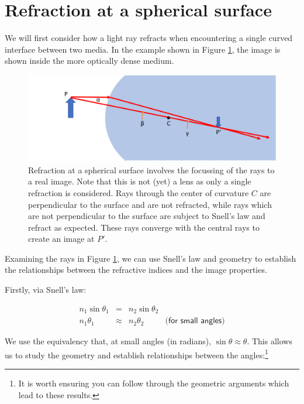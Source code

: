 \documentclass[
]{book}
\begin{document}
\hypertarget{sec:ch16-sphericalsurface1}{%
\section{Refraction at a spherical surface}\label{sec:ch16-sphericalsurface1}}

We will first consider how a light ray refracts when encountering a single curved interface between two media. In the example shown in Figure \ref{fig:ch16-sphericalsurface1}, the image is shown inside the more optically dense medium.

\begin{figure}

{\centering \includegraphics[width=0.7\linewidth]{visualisations/LaTeX/ch16-sphericalsurface} 

}

\caption{Refraction at a spherical surface involves the focussing of the rays to a real image. Note that this is not (yet) a lens as only a single refraction is considered. Rays through the center of curvature $C$ are perpendicular to the surface and are not refracted, while rays which are not perpendicular to the surface are subject to Snell's law and refract as expected. These rays converge with the central rays to create an image at $P'$.}\label{fig:ch16-sphericalsurface1}
\end{figure}

Examining the rays in Figure \ref{fig:ch16-sphericalsurface1}, we can use Snell's law and geometry to establish the relationships between the refractive indices and the image properties.

Firstly, via Snell's law:

\begin{equation}
\begin{array}{rcll}
n_1 \sin \theta_1 &=& n_2 \sin \theta_2 &\\
n_1 \theta_1 &\approx& n_2 \theta_2 & \textsf{(for small angles)}
\end{array}
\label{eq:ch16-lensequation1}
\end{equation}

We use the equivalency that, at small angles (in radians), \(\sin \theta \approx \theta\). This allows us to study the geometry and establish relationships between the angles:\footnote{It is worth ensuring you can follow through the geometric arguments which lead to these results.}
\end{document}
